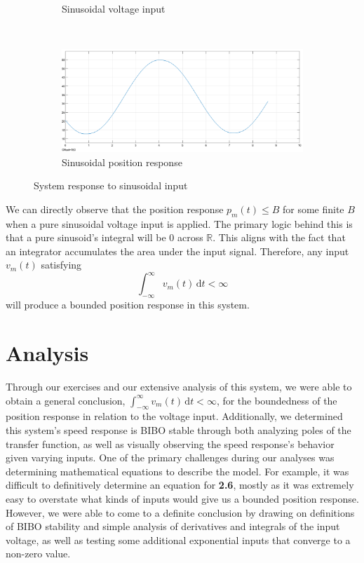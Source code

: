 \documentclass{article}
\begin{document}
\begin{figure}[H]
\begin{subfigure}[b]{0.45\linewidth}
        \caption{Sinusoidal voltage input}
        \label{fig:sinevoltage}
    \end{subfigure}
    \\[\baselineskip]
    \begin{subfigure}[b]{0.45\linewidth}
        \centering
        \includegraphics[width=\linewidth]{sinepos.png}
        \caption{Sinusoidal position response}
        \label{fig:sisepos}
    \end{subfigure}
    \caption{System response to sinusoidal input}
    \label{fig:sine}
\end{figure}
\noindent We can directly observe that the position response $p_m(t) \le B$ for some finite $B$ when a pure sinusoidal voltage input is applied. The primary logic behind this is that a pure sinusoid's integral will be 0 across $\mathbb{R}$. This aligns with the fact that an integrator accumulates the area under the input signal. Therefore, any input $v_m(t)$ satisfying
\begin{equation}
    \int_{-\infty}^\infty v_m(t)\, \mathrm{d}t < \infty
\end{equation}
will produce a bounded position response in this system.

\section{Analysis}
Through our exercises and our extensive analysis of this system, we were able to obtain a general conclusion, $\int_{-\infty}^\infty v_m(t)\, \mathrm{d}t < \infty$, for the boundedness of the position response in relation to the voltage input. Additionally, we determined this system's speed response is BIBO stable through both analyzing poles of the transfer function, as well as visually observing the speed response's behavior given varying inputs. One of the primary challenges during our analyses was determining mathematical equations to describe the model. For example, it was difficult to definitively determine an equation for \textbf{2.6}, mostly as it was extremely easy to overstate what kinds of inputs would give us a bounded position response. However, we were able to come to a definite conclusion by drawing on definitions of BIBO stability and simple analysis of derivatives and integrals of the input voltage, as well as testing some additional exponential inputs that converge to a non-zero value. 
\end{document}
